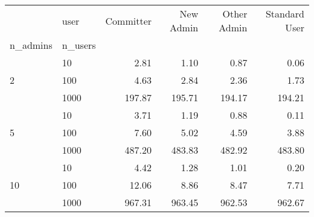 \begin{tabular}{llrrrr}
\toprule
 & user & Committer & New Admin & Other Admin & Standard User \\
n_admins & n_users &  &  &  &  \\
\midrule
\multirow[t]{3}{*}{2} & 10 & 2.81 & 1.10 & 0.87 & 0.06 \\
 & 100 & 4.63 & 2.84 & 2.36 & 1.73 \\
 & 1000 & 197.87 & 195.71 & 194.17 & 194.21 \\
\cline{1-6}
\multirow[t]{3}{*}{5} & 10 & 3.71 & 1.19 & 0.88 & 0.11 \\
 & 100 & 7.60 & 5.02 & 4.59 & 3.88 \\
 & 1000 & 487.20 & 483.83 & 482.92 & 483.80 \\
\cline{1-6}
\multirow[t]{3}{*}{10} & 10 & 4.42 & 1.28 & 1.01 & 0.20 \\
 & 100 & 12.06 & 8.86 & 8.47 & 7.71 \\
 & 1000 & 967.31 & 963.45 & 962.53 & 962.67 \\
\cline{1-6}
\bottomrule
\end{tabular}
